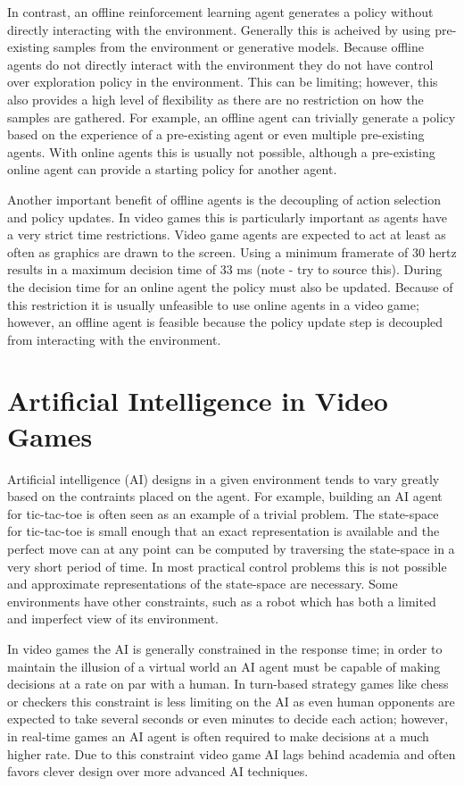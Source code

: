 In contrast, an offline reinforcement learning agent generates a policy without directly interacting with the environment. Generally this is acheived by using pre-existing samples from the environment or generative models. Because offline agents do not directly interact with the environment they do not have control over exploration policy in the environment. This can be limiting; however, this also provides a high level of flexibility as there are no restriction on how the samples are gathered. For example, an offline agent can trivially generate a policy based on the experience of a pre-existing agent or even multiple pre-existing agents. With online agents this is usually not possible, although a pre-existing online agent can provide a starting policy for another agent.

Another important benefit of offline agents is the decoupling of action selection and policy updates. In video games this is particularly important as agents have a very strict time restrictions. Video game agents are expected to act at least as often as graphics are drawn to the screen. Using a minimum framerate of 30 hertz results in a maximum decision time of 33 ms (note - try to source this). During the decision time for an online agent the policy must also be updated. Because of this restriction it is usually unfeasible to use online agents in a video game; however, an offline agent is feasible because the policy update step is decoupled from interacting with the environment.

\section{Artificial Intelligence in Video Games}

Artificial intelligence (AI) designs in a given environment tends to vary greatly based on the contraints placed on the agent. For example, building an AI agent for tic-tac-toe is often seen as an example of a trivial problem. The state-space for tic-tac-toe is small enough that an exact representation is available and the perfect move can at any point can be computed by traversing the state-space in a very short period of time. In most practical control problems this is not possible and approximate representations of the state-space are necessary. Some environments have other constraints, such as a robot which has both a limited and imperfect view of its environment.

In video games the AI is generally constrained in the response time; in order to maintain the illusion of a virtual world an AI agent must be capable of making decisions at a rate on par with a human. In turn-based strategy games like chess or checkers this constraint is less limiting on the AI as even human opponents are expected to take several seconds or even minutes to decide each action; however, in real-time games an AI agent is often required to make decisions at a much higher rate. Due to this constraint video game AI lags behind academia and often favors clever design over more advanced AI techniques.

